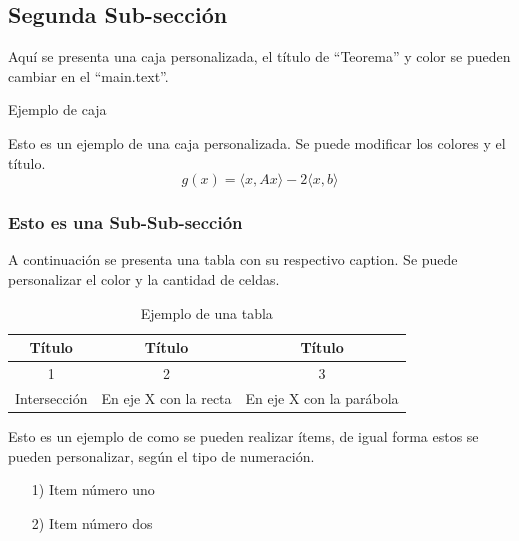 \subsection{Segunda Sub-sección}

Aquí se presenta una caja personalizada, el título de “Teorema” y color se pueden cambiar en el “main.text”. 

\vspace{1em}

\begin{example}[label={ex:se}]{Ejemplo de caja}

Esto es un ejemplo de una caja personalizada. Se puede modificar los colores y el título. 
$$ g(x) =  \langle x, Ax\rangle - 2 \langle x,b \rangle  $$
 
\end{example}


\subsubsection{Esto es una Sub-Sub-sección}
A continuación se presenta una tabla con su respectivo caption. Se puede personalizar el color y la cantidad de celdas.

\vspace{1em}

\begin{table}[ht]
\begin{center}
\begin{tabular}{ | c | c | c |}
\hline \cellcolor[HTML]{f2f2ff} Título  &  \cellcolor[HTML]{f2f2ff} Título & \cellcolor[HTML]{f2f2ff} Título \\ \hline
1 & 2 & 3 \\ \hline
Intersección & En eje X con la recta & En eje X con la parábola \\ \hline
\end{tabular}
\caption{Ejemplo de una tabla}
\end{center}
\end{table}

Esto es un ejemplo de como se pueden realizar ítems, de igual forma estos se pueden personalizar, según el tipo de numeración.

\begin{itemize}
    \item[1)] Item número uno
    \item[2)] Item número dos
\end{itemize}

